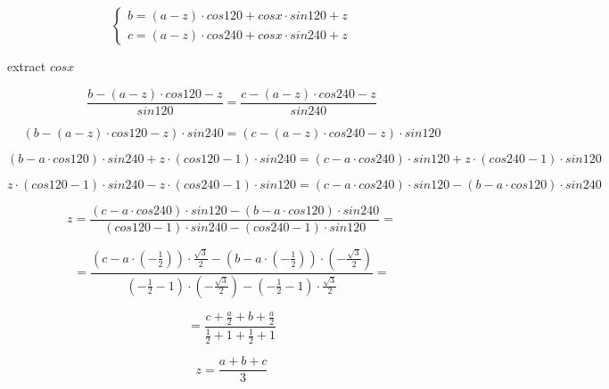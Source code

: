 \documentclass[unicode, 12pt, a4paper]{article}
\begin{document}
\begin{equation}
  \begin{cases}
    b = (a - z) \cdot cos 120 + cos x \cdot sin 120 + z\\
    c = (a - z) \cdot cos 240 + cos x \cdot sin 240 + z
  \end{cases}
\end{equation}

extract $cos x$

\begin{equation}
  \frac{b - (a - z) \cdot cos 120 - z}{sin 120} = \frac{c - (a - z) \cdot cos 240 - z}{sin 240}
\end{equation}


\begin{equation}
  (b - (a - z) \cdot cos 120 - z) \cdot sin 240 = (c - (a - z) \cdot cos 240 - z) \cdot sin 120
\end{equation}

\begin{equation}
  (b - a \cdot cos 120) \cdot sin 240 + z \cdot (cos 120 - 1) \cdot sin 240 = (c - a \cdot cos 240) \cdot sin 120 + z \cdot (cos 240 - 1) \cdot sin 120
\end{equation}


\begin{equation}
  z \cdot (cos 120 - 1) \cdot sin 240  - z \cdot (cos 240 - 1) \cdot sin 120 = (c - a \cdot cos 240) \cdot sin 120 - (b - a \cdot cos 120) \cdot sin 240
\end{equation}


\begin{equation}
  z = \frac{(c - a \cdot cos 240) \cdot sin 120 - (b - a \cdot cos 120) \cdot sin 240}{(cos 120 - 1) \cdot sin 240  - (cos 240 - 1) \cdot sin 120} =
\end{equation}

\begin{equation}
  = \frac{(c - a \cdot (-\frac{1}{2})) \cdot \frac{\sqrt{3}}{2} - (b - a \cdot (-\frac{1}{2})) \cdot (-\frac{\sqrt{3}}{2})}{(-\frac{1}{2} - 1) \cdot (-\frac{\sqrt{3}}{2})  - (-\frac{1}{2} - 1) \cdot \frac{\sqrt{3}}{2}} =
\end{equation}

\begin{equation}
  = \frac{c + \frac{a}{2} + b + \frac{a}{2}}{\frac{1}{2} + 1 + \frac{1}{2} + 1}
\end{equation}


\begin{equation}
  z = \frac{a + b + c}{3}
\end{equation}
\end{document}
